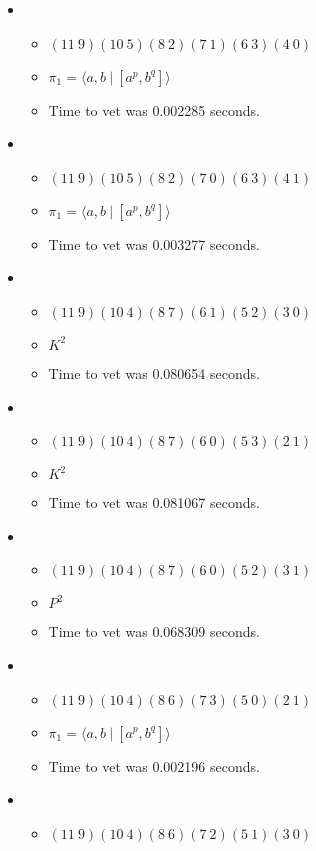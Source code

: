 \documentclass{article}
\begin{document}
\begin{itemize}
\item \begin{itemize}
      \item $(11\ 9)(10\ 5)(8\ 2)(7\ 1)(6\ 3)(4\ 0)$
      \item $\pi_1 = \langle a,b\ |\ [a^p,b^q]\rangle$
      \item Time to vet was 0.002285 seconds.
\end{itemize}
\item \begin{itemize}
      \item $(11\ 9)(10\ 5)(8\ 2)(7\ 0)(6\ 3)(4\ 1)$
      \item $\pi_1 = \langle a,b\ |\ [a^p,b^q]\rangle$
      \item Time to vet was 0.003277 seconds.
\end{itemize}
\item \begin{itemize}
      \item $(11\ 9)(10\ 4)(8\ 7)(6\ 1)(5\ 2)(3\ 0)$
      \item $K^2$
      \item Time to vet was 0.080654 seconds.
\end{itemize}
\item \begin{itemize}
      \item $(11\ 9)(10\ 4)(8\ 7)(6\ 0)(5\ 3)(2\ 1)$
      \item $K^2$
      \item Time to vet was 0.081067 seconds.
\end{itemize}
\item \begin{itemize}
      \item $(11\ 9)(10\ 4)(8\ 7)(6\ 0)(5\ 2)(3\ 1)$
      \item $P^2$
      \item Time to vet was 0.068309 seconds.
\end{itemize}
\item \begin{itemize}
      \item $(11\ 9)(10\ 4)(8\ 6)(7\ 3)(5\ 0)(2\ 1)$
      \item $\pi_1 = \langle a,b\ |\ [a^p,b^q]\rangle$
      \item Time to vet was 0.002196 seconds.
\end{itemize}
\item \begin{itemize}
      \item $(11\ 9)(10\ 4)(8\ 6)(7\ 2)(5\ 1)(3\ 0)$

\end{itemize}
\end{itemize}
\end{document}
